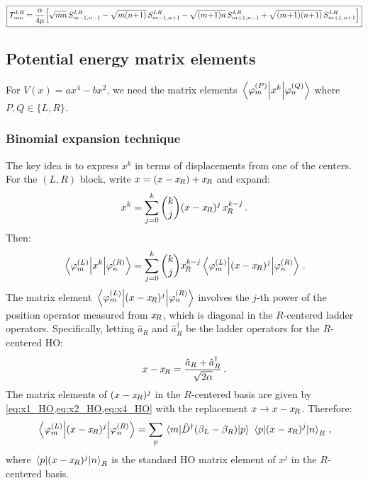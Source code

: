 \begin{equation}\label{eq:T_LR}
  \boxed{T_{mn}^{LR} = \frac{\alpha}{4\mu}\Bigl[
    \sqrt{mn}\,S_{m-1,n-1}^{LR}
    - \sqrt{m(n\!+\!1)}\,S_{m-1,n+1}^{LR}
    - \sqrt{(m\!+\!1)n}\,S_{m+1,n-1}^{LR}
    + \sqrt{(m\!+\!1)(n\!+\!1)}\,S_{m+1,n+1}^{LR}
  \Bigr]}
\end{equation}

\subsection{Potential energy matrix elements}\label{sec:shifted_potential}

For $V(x) = ax^4 - bx^2$, we need the matrix elements $\mel{\varphi_m^{(P)}}{x^k}{\varphi_n^{(Q)}}$
where $P, Q \in \{L, R\}$.

\subsubsection{Binomial expansion technique}

The key idea is to express $x^k$ in terms of displacements from one of the centers.
For the $(L,R)$ block, write $x = (x - x_{\!R}) + x_{\!R}$ and expand:
\begin{equation}
  x^k = \sum_{j=0}^{k}\binom{k}{j}(x-x_{\!R})^j\,x_{\!R}^{k-j}\,.
\end{equation}
Then:
\begin{equation}
  \mel{\varphi_m^{(L)}}{x^k}{\varphi_n^{(R)}}
  = \sum_{j=0}^{k}\binom{k}{j}x_{\!R}^{k-j}\mel{\varphi_m^{(L)}}{(x-x_{\!R})^j}{\varphi_n^{(R)}}\,.
\end{equation}
The matrix element $\mel{\varphi_m^{(L)}}{(x-x_{\!R})^j}{\varphi_n^{(R)}}$ involves the
$j$-th power of the position operator measured from $x_{\!R}$, which is diagonal in the
$R$-centered ladder operators. Specifically, letting $\hat{a}_R$ and $\hat{a}_R^\dagger$
be the ladder operators for the $R$-centered HO:
\begin{equation}
  x - x_{\!R} = \frac{\hat{a}_R + \hat{a}_R^\dagger}{\sqrt{2\alpha}}\,.
\end{equation}
The matrix elements of $(x-x_{\!R})^j$ in the $R$-centered basis are given by
\cref{eq:x1_HO,eq:x2_HO,eq:x4_HO} with the replacement $x \to x - x_{\!R}$.
Therefore:
\begin{equation}
  \mel{\varphi_m^{(L)}}{(x-x_{\!R})^j}{\varphi_n^{(R)}}
  = \sum_p \mel{m}{\hat{D}^\dagger(\beta_L-\beta_R)}{p}\,\mel{p}{(x-x_{\!R})^j}{n}_R\,,
\end{equation}
where $\mel{p}{(x-x_{\!R})^j}{n}_R$ is the standard HO matrix element of $x^j$ in the $R$-centered basis.

